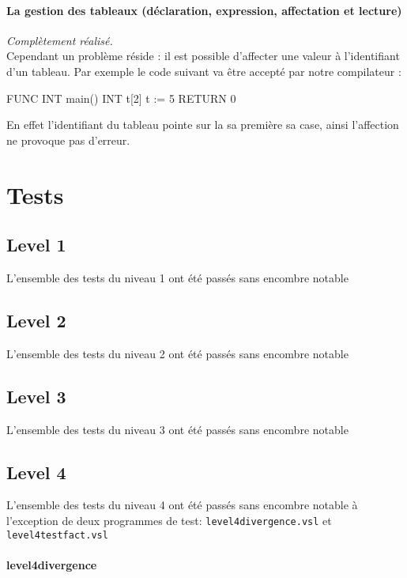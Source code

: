 \documentclass{article}
\begin{document}
\paragraph{La gestion des tableaux (déclaration, expression, affectation et
  lecture)} 
\textit{Complètement réalisé.}\\
Cependant un problème réside : il est possible d'affecter une valeur à l'identifiant d'un tableau.
Par exemple le code suivant va être accepté par notre compilateur :
\begin{verbatimtab}
FUNC INT main() {
   INT t[2]
   t := 5
   RETURN 0
}

\end{verbatimtab}

En effet l'identifiant du tableau pointe sur la sa première sa case, ainsi l'affection ne provoque pas d'erreur.

\section{Tests}

\subsection{Level 1}

L'ensemble des tests du niveau 1 ont été passés sans encombre notable

\subsection{Level 2}

L'ensemble des tests du niveau 2 ont été passés sans encombre notable

\subsection{Level 3}

L'ensemble des tests du niveau 3 ont été passés sans encombre notable

\subsection{Level 4}

L'ensemble des tests du niveau 4 ont été passés sans encombre notable à
l'exception de deux programmes de test: \texttt{level4divergence.vsl} et
\texttt{level4testfact.vsl}

\paragraph{level4divergence}
\end{document}
